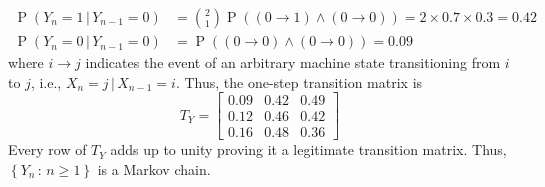 \documentclass[answers]{exam}
\DeclareMathOperator{\Prob}{P}
\begin{document}
\begin{questions}
\begin{solution}
\begin{align}
        \Prob(Y_{n}=1\,|\,Y_{n-1}=0) &= \binom{2}{1}\Prob((0\to1)\wedge(0\to0)) = 2\times0.7\times0.3 = 0.42\\
        \Prob(Y_{n}=0\,|\,Y_{n-1}=0) &= \Prob((0\to0)\wedge(0\to0)) = 0.09
    \end{align}
    where $i\to j$ indicates the event of an arbitrary machine state transitioning from $i$ to $j$, i.e., $X_{n}=j\,|\,X_{n-1}=i$.
    Thus, the one-step transition matrix is
    \begin{equation}
        T_{Y} = \begin{bmatrix} 0.09 & 0.42 & 0.49 \\ 0.12 & 0.46 & 0.42 \\ 0.16 & 0.48 & 0.36 \end{bmatrix}
    \end{equation}
    Every row of $T_{Y}$ adds up to unity proving it a legitimate transition matrix. Thus, $\left\{Y_{n}\,:\,n\geq 1\right\}$ is a Markov chain.
  \end{solution}
\end{questions}
\end{document}
